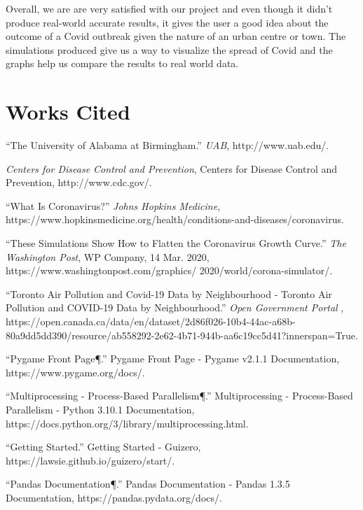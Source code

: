 \documentclass{article}
\begin{document}
Overall, we are are very satisfied with our project and even though it didn't produce real-world accurate results, it gives the user a good idea about the outcome of a Covid outbreak given the nature of an urban centre or town. The simulations produced  give us a way to visualize the spread of Covid and the graphs help us compare the results to real world data.

\bigskip

\section{Works Cited}

“The University of Alabama at Birmingham.” \emph{UAB}, http://www.uab.edu/.
\bigskip

\emph{Centers for Disease Control and Prevention}, Centers for Disease Control and
Prevention, http://www.cdc.gov/. 
\bigskip 
 
“What Is Coronavirus?” \emph{Johns Hopkins Medicine}, 
https://www.hopkinsmedicine.org/health/conditions-and-diseases/coronavirus. 
\bigskip

“These Simulations Show How to Flatten the Coronavirus Growth Curve.” \emph{The Washington
Post}, WP Company, 14 Mar. 2020, 
https://www.washingtonpost.com/graphics/
2020/world/corona-simulator/. 
\bigskip

“Toronto Air Pollution and Covid-19 Data by Neighbourhood - Toronto Air Pollution and COVID-19 Data by Neighbourhood.” \emph{Open Government Portal} , https://open.canada.ca/data/en/dataset/2d86f026-10b4-44ac-a68b-80a9dd5dd390/resource/ab558292-2e62-4b71-944b-aa6c19cc5d41?innerspan=True. 
\bigskip

“Pygame Front Page¶.” Pygame Front Page - Pygame v2.1.1 Documentation, https://www.pygame.org/docs/. 
\bigskip

“Multiprocessing - Process-Based Parallelism¶.” Multiprocessing - Process-Based Parallelism - Python 3.10.1 Documentation, https://docs.python.org/3/library/multiprocessing.html. 
\bigskip

“Getting Started.” Getting Started - Guizero, https://lawsie.github.io/guizero/start/. 
\bigskip

“Pandas Documentation¶.” Pandas Documentation - Pandas 1.3.5 Documentation, https://pandas.pydata.org/docs/. 
\bigskip
\end{document}
